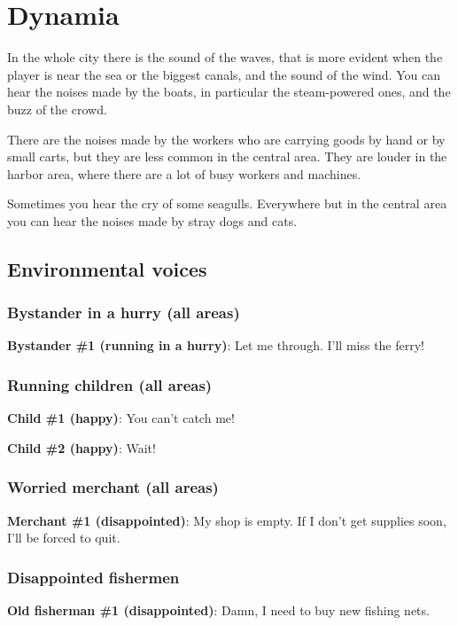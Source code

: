 \section{Dynamia}

In the whole city there is the sound of the waves, that is more evident when the player is near the sea or the biggest canals, and the sound of the wind. You can hear the noises made by the boats, in particular the steam-powered ones, and the buzz of the crowd.

There are the noises made by the workers who are carrying goods by hand or by small carts, but they are less common in the central area. They are louder in the harbor area, where there are a lot of busy workers and machines.

Sometimes you hear the cry of some seagulls. Everywhere but in the central area you can hear the noises made by stray dogs and cats.

\subsection{Environmental voices}
\subsubsection*{Bystander in a hurry (all areas)}
\textbf{Bystander \#{}1 (running in a hurry)}: Let me through. I'll miss the ferry!

\subsubsection*{Running children (all areas)}
\textbf{Child \#{}1 (happy)}: You can't catch me!

\textbf{Child \#{}2 (happy)}: Wait!

\subsubsection*{Worried merchant (all areas)}
\textbf{Merchant \#{}1 (disappointed)}: My shop is empty. If I don't get supplies soon, I'll be forced to quit.

\subsubsection*{Disappointed fishermen}
\textbf{Old fisherman \#{}1 (disappointed)}: Damn, I need to buy new fishing nets.

